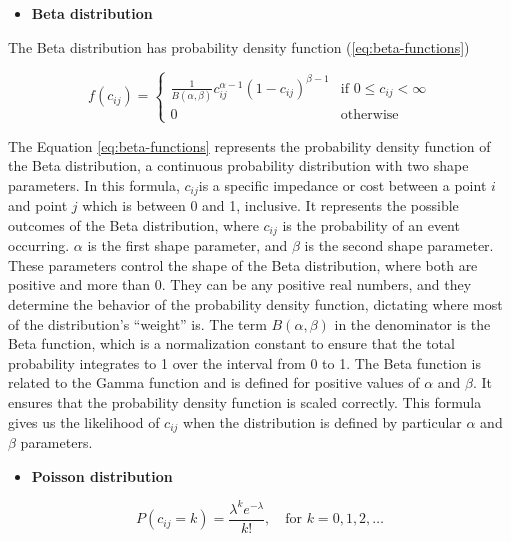 \documentclass[
11pt, %
oneside, %
english, %
singlespacing, %
]{macthesis} %
\def\tightlist{}
\begin{document}
\begin{itemize}
\tightlist
\item
  \textbf{Beta distribution}
\end{itemize}

The Beta distribution has probability density function (\ref{eq:beta-functions})

\begin{equation}
f(c_{ij}) = 
\begin{cases}
\frac{1}{B(\alpha, \beta)} c_{ij}^{\alpha - 1}(1 - c_{ij})^{\beta - 1} & \text{if } 0 \leq c_{ij} < \infty \\
0 & \text{otherwise}
\end{cases}
\label{eq:beta-functions}
\end{equation}

The Equation \ref{eq:beta-functions} represents the probability density function of the Beta distribution, a continuous probability distribution with two shape parameters. In this formula, \(c_{ij}\)is a specific impedance or cost between a point \(i\) and point \(j\) which is between 0 and 1, inclusive. It represents the possible outcomes of the Beta distribution, where \(c_{ij}\) is the probability of an event occurring. \(\alpha\) is the first shape parameter, and \(\beta\) is the second shape parameter. These parameters control the shape of the Beta distribution, where both are positive and more than 0. They can be any positive real numbers, and they determine the behavior of the probability density function, dictating where most of the distribution's ``weight'' is. The term \(B(\alpha, \beta)\) in the denominator is the Beta function, which is a normalization constant to ensure that the total probability integrates to 1 over the interval from 0 to 1. The Beta function is related to the Gamma function and is defined for positive values of \(\alpha\) and \(\beta\). It ensures that the probability density function is scaled correctly. This formula gives us the likelihood of \(c_{ij}\) when the distribution is defined by particular \(\alpha\) and \(\beta\) parameters.

\begin{itemize}
\tightlist
\item
  \textbf{Poisson distribution}
\end{itemize}

\begin{equation}
P(c_{ij} = k) = \frac{\lambda^k e^{-\lambda}}{k!}, \quad \text{for } k = 0, 1, 2, \ldots
\label{eq:poisson-functions}
\end{equation}
\end{document}
